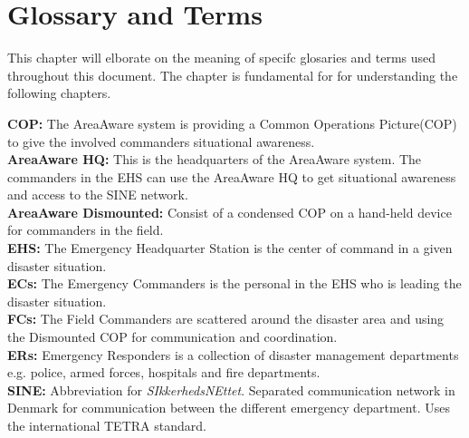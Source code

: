 \appendix
\label{chp_appendix}
\chapter{Glossary and Terms}

This chapter will elborate on the meaning of specifc glosaries and terms used throughout this document. The chapter is fundamental for for understanding the following chapters.
\newline

\textbf{COP:} The AreaAware system is providing a Common Operations Picture(COP) to give the involved commanders situational awareness.\\

\noindent \textbf{AreaAware HQ:} This is the headquarters of the AreaAware system. The commanders in the EHS can use the AreaAware HQ to get situational awareness and access to the SINE network.\\

\noindent \textbf{AreaAware Dismounted:} Consist of a condensed COP on a hand-held device for commanders in the field.\\

\noindent \textbf{EHS:} The Emergency Headquarter Station is the center of command in a given disaster situation.\\

\noindent \textbf{ECs:} The Emergency Commanders is the personal in the EHS who is leading the disaster situation.\\

\noindent \textbf{FCs:} The Field Commanders are scattered around the disaster area and using the Dismounted COP for communication and coordination.\\

\noindent \textbf{ERs:} Emergency Responders is a collection of disaster management departments e.g. police, armed forces, hospitals and fire departments.\\

\noindent \textbf{SINE:} Abbreviation for \textit{SIkkerhedsNEttet}. Separated communication network in Denmark for communication between the different emergency department. Uses the international TETRA standard.\\